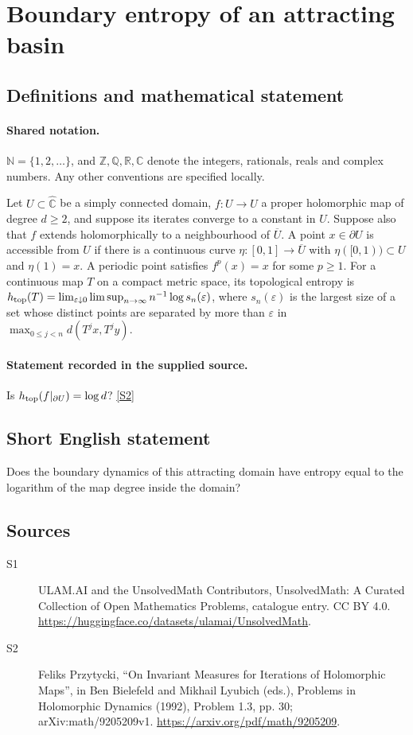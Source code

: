 \documentclass[11pt]{article}
\newcommand{\sref}[2]{\hyperlink{source:#1:#2}{[S#2]}}
\begin{document}
\section{Boundary entropy of an attracting basin}\label{statement}

\subsection{Definitions and mathematical statement}

\paragraph{Shared notation.}$\mathbb N=\{1,2,\ldots\}$, and $\mathbb Z,\mathbb Q,\mathbb R,\mathbb C$ denote the integers, rationals, reals and complex numbers. Any other conventions are specified locally.


Let $U\subset\widehat{\mathbb C}$ be a simply connected domain, $f:U\to U$ a proper holomorphic map of degree $d\geq2$, and suppose its iterates converge to a constant in $U$. Suppose also that $f$ extends holomorphically to a neighbourhood of $\overline U$. A point $x\in\partial U$ is accessible from $U$ if there is a continuous curve $\eta:[0,1]\to\overline U$ with $\eta([0,1))\subset U$ and $\eta(1)=x$. A periodic point satisfies $f^p(x)=x$ for some $p\geq1$. For a continuous map $T$ on a compact metric space, its topological entropy is $h_{\rm top}(T)=\lim_{\varepsilon\downarrow0}\limsup_{n\to\infty}n^{-1}\log s_n(\varepsilon)$, where $s_n(\varepsilon)$ is the largest size of a set whose distinct points are separated by more than $\varepsilon$ in $\max_{0\leq j<n}d(T^jx,T^jy)$.
\paragraph{Statement recorded in the supplied source.}
Is $h_{\rm top}(f|_{\partial U})=\log d$? \sref{statement}{2}
\subsection{Short English statement}
Does the boundary dynamics of this attracting domain have entropy equal to the logarithm of the map degree inside the domain?
\subsection{Sources}
\begin{description}
\item[\hypertarget{source:statement:1}{S1}] ULAM.AI and the UnsolvedMath Contributors, UnsolvedMath: A Curated Collection of Open Mathematics Problems, catalogue entry. CC BY 4.0. \url{https://huggingface.co/datasets/ulamai/UnsolvedMath}.
\item[\hypertarget{source:statement:2}{S2}] Feliks Przytycki, ``On Invariant Measures for Iterations of Holomorphic Maps'', in Ben Bielefeld and Mikhail Lyubich (eds.), Problems in Holomorphic Dynamics (1992), Problem 1.3, pp. 30; arXiv:math/9205209v1. \url{https://arxiv.org/pdf/math/9205209}.
\end{description}
\label{end:statement}
\end{document}

